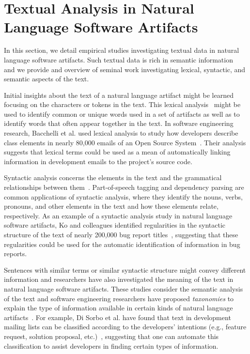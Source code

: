 



\section{Textual Analysis in Natural Language Software Artifacts}
\label{cp2:text-in-se}



In this section, we detail empirical studies investigating 
textual data in natural language software artifacts. 
Such textual data is  rich in semantic information~\cite{dekhtyar2004} 
and we provide and overview of seminal work 
investigating lexical, syntactic, and semantic aspects of the text.




Initial insights about the text of a natural language artifact might be learned focusing on 
the characters or tokens in the text.
This lexical analysis~\cite{jurafsky2014speech} might be used to identify common or unique words 
used in a set of artifacts as well as to identify words that often appear together in the text.
In software engineering research, Bacchelli et al. used lexical analysis to study how developers describe class elements
in nearly 80,000 emails of an Open Source System~\cite{bacchelli2009}.
Their analysis suggests that lexical terms could be 
used as a mean of automatically linking information in development emails to 
the project's source code.







Syntactic analysis concerns the  elements in the text 
and the grammatical relationships between them~\cite{jurafsky2014speech}. 
Part-of-speech tagging and dependency parsing are common applications of syntactic analysis,
where they identify the nouns, verbs, pronouns, and other elements in the text 
and how these elements relate, respectively. 
As an example of a syntactic analysis study in natural language software artifacts, 
Ko and colleagues identified regularities in the syntactic structure of the text 
of nearly 200,000 bug report titles~\cite{Ko2006}, suggesting that these 
regularities could be used for the automatic identification 
of information in bug reports. 






Sentences with similar terms or similar syntactic structure might convey different information
and researchers have also investigated the meaning of the text in natural language software artifacts. 
These studies consider the semantic analysis of the text and 
software engineering researchers have proposed \textit{taxonomies} to explain the type of information 
available in certain kinds of natural language artifacts~\cite{Maalej2013, Arya2019}. 
For example, Di Sorbo et al. have found that 
text in development mailing lists can be classified according to the developers' intentions (e.g., feature request, solution proposal, etc.)~\cite{Sorbo2015},
suggesting that one can automate this classification to assist developers in finding 
certain types of information.




